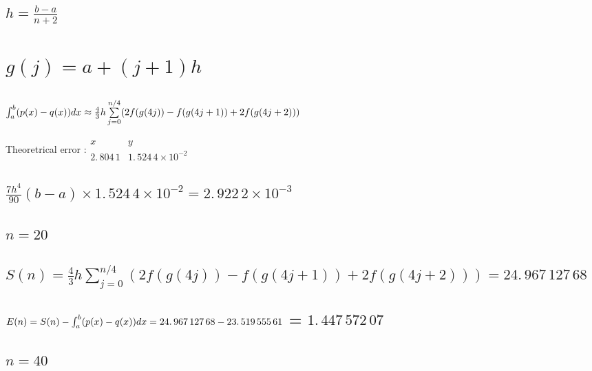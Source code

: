 \documentclass{article}
\begin{document}
\subsection{$h=\frac{b-a}{n+2}$}

\section{$g(j)=a+(j+1)h$}

\subsection{$\protect\int_{a}^{b}(p(x)-q(x))dx\approx \frac{4}{3}%
h\sum\limits_{j=0}^{n/4}(2f(g(4j))-f(g(4j+1))+2f(g(4j+2)))$}

Theoretrical error :$%
\begin{array}{cc}
x & y \\ 
2.\,\allowbreak 804\,1 & 1.\,\allowbreak 524\,4\times 10^{-2}%
\end{array}%
$

\subsection{$\frac{7h^{4}}{90}(b-a)\times 1.\,\allowbreak 524\,4\times
10^{-2}=\allowbreak 2.\,\allowbreak 922\,2\times 10^{-3}$}

\subsection{\protect\bigskip $n=20$}

\subsection{$S(n)=\frac{4}{3}h\sum%
\limits_{j=0}^{n/4}(2f(g(4j))-f(g(4j+1))+2f(g(4j+2)))=\allowbreak
24.\,\allowbreak 967\,127\,68$}

\subsection{$E(n)=S(n)-\protect\int_{a}^{b}(p(x)-q(x))dx\allowbreak
\allowbreak =\allowbreak 24.\,\allowbreak 967\,127\,68-\allowbreak
23.\,\allowbreak 519\,555\,61$ = $1.\,\allowbreak 447\,572\,07$}

\subsection{$n=40$}
\end{document}
